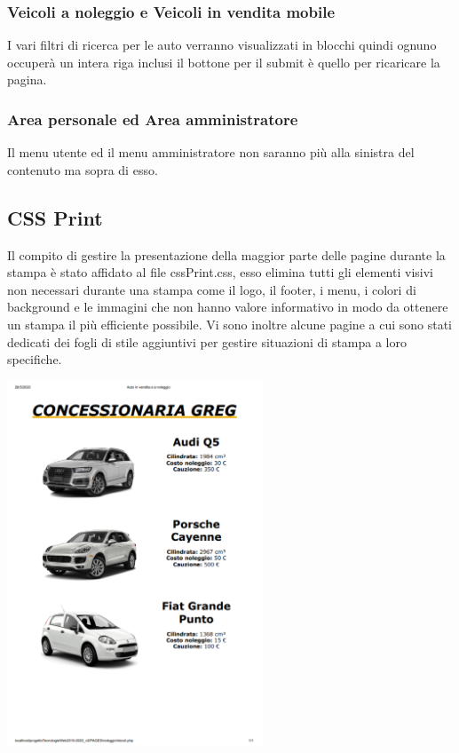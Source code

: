         \subsubsection{Veicoli a noleggio e Veicoli in vendita mobile}
        I vari filtri di ricerca per le auto verranno visualizzati in blocchi quindi ognuno occuperà un intera riga inclusi il bottone per il submit è quello per ricaricare la pagina.

        \subsubsection{Area personale ed Area amministratore}
        Il menu utente ed il menu amministratore non saranno più alla sinistra del contenuto ma sopra di esso.
    
    \subsection{CSS Print}
        Il compito di gestire la presentazione della maggior parte delle pagine durante la stampa è stato affidato al file cssPrint.css, esso elimina tutti gli elementi visivi non necessari durante una stampa come il logo, il footer, i menu, i colori di background e le immagini che non hanno valore informativo in modo da ottenere un stampa il più efficiente possibile.
        Vi sono inoltre alcune pagine a cui sono stati dedicati dei fogli di stile aggiuntivi per gestire situazioni di stampa a loro specifiche.

    \begin{center}
        \includegraphics[width=18pc]{./img/StampaVeicoliNoleggio.png}
    \end{center}

\pagebreak